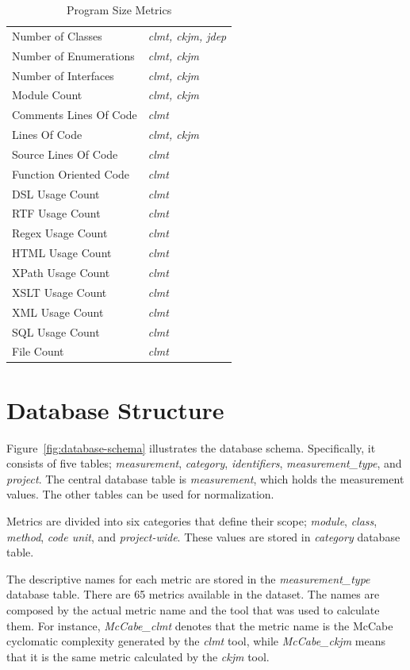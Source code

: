 \documentclass{sig-alternate}
\begin{document}
\begin{table}
\centering
\caption{Program Size Metrics}
\label{tbl:size-selected-metrics}
\begin{tabular}{l l}
 \hline
Number of Classes & \textit{clmt, ckjm, jdep}\\
Number of Enumerations & \textit{clmt, ckjm}\\
Number of Interfaces & \textit{clmt, ckjm}\\
Module Count & \textit{clmt, ckjm}\\
Comments Lines Of Code & \textit{clmt}\\
Lines Of Code & \textit{clmt, ckjm}\\
Source Lines Of Code & \textit{clmt}\\
Function Oriented Code & \textit{clmt}\\
DSL Usage Count & \textit{clmt}\\
RTF Usage Count & \textit{clmt}\\
Regex Usage Count & \textit{clmt}\\
HTML Usage Count & \textit{clmt}\\
XPath Usage Count & \textit{clmt}\\
XSLT Usage Count & \textit{clmt}\\
XML Usage Count & \textit{clmt}\\
SQL Usage Count & \textit{clmt}\\
File Count & \textit{clmt}\\
\hline
\end{tabular}
\end{table}

\section{Database Structure}
\label{sec:db}

Figure~\ref{fig:database-schema} illustrates the database schema. Specifically, it consists of five tables; \textit{measurement}, \textit{category}, \textit{identifiers}, \textit{measurement\_type}, and \textit{project}. The central database table is \textit{measurement}, which holds the measurement values. The other tables can be used for normalization.

Metrics are divided into six categories that define their scope; \textit{module}, \textit{class}, \textit{method}, \textit{code unit}, and \textit{project-wide}. These values are stored in \textit{category} database table.

The descriptive names for each metric are stored in the \textit{measurement\_type} database table. There are 65 metrics available in the dataset. The names are composed by the actual metric name and the tool that was used to calculate them. For instance, \textit{McCabe\_clmt} denotes that the metric name is the McCabe cyclomatic complexity generated by the \textit{clmt} tool, while \textit{McCabe\_ckjm} means that it is the same metric calculated by the \textit{ckjm} tool.
\end{document}
